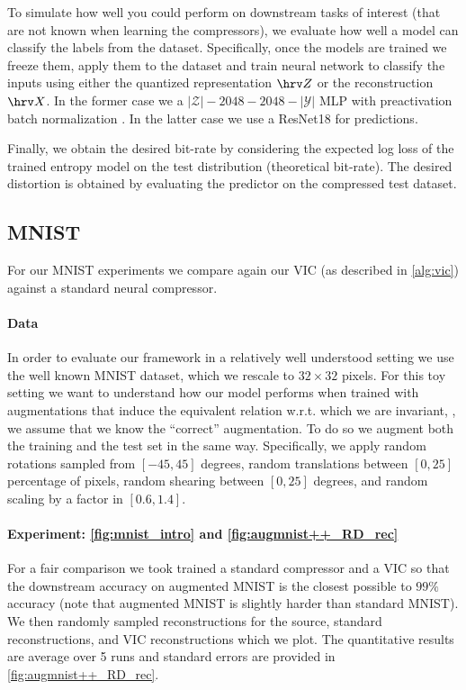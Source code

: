 \documentclass[final]{article}
\begin{document}
To simulate how well you could perform on downstream tasks of interest (that are not known when learning the compressors), we evaluate how well a model can classify the labels from the dataset.
Specifically, once the models are trained we freeze them, apply them to the dataset and train neural network to classify the inputs using either the quantized representation $\hrv Z$ or the reconstruction $\hrv X$.
In the former case we a $|\mathcal{Z}|-2048-2048-|\mathcal{Y}|$ MLP with preactivation batch normalization \cite{ioffe_batch_2015}.
In the latter case we use a ResNet18 for predictions.

Finally, we obtain the desired bit-rate by considering the expected log loss of the trained entropy model on the test distribution (\ie theoretical bit-rate).
The desired distortion is obtained by evaluating the predictor on the compressed test dataset.



\subsection{MNIST}
\label{appx:reproducability_mnist}

For our MNIST \cite{lecun_gradient-based_1998} experiments we compare again our VIC (as described in \cref{alg:vic}) against a standard neural compressor.

\paragraph{Data}
In order to evaluate our framework in a relatively well understood setting we use the well known  MNIST \cite{lecun_gradient-based_1998} dataset, which we rescale to $32\times32$ pixels.
For this toy setting we want to understand how our model performs when trained with augmentations that induce the equivalent relation w.r.t. which we are invariant, \ie, we assume that we know the ``correct'' augmentation.
To do so we augment both the training and the test set in the same way.
Specifically, we apply random rotations sampled from $[-45,45]$ degrees, random translations between $[0,25]$ percentage of pixels, random shearing between $[0,25]$ degrees, and random scaling by a factor in $[0.6,1.4]$. 

\paragraph{Experiment: \cref{fig:mnist_intro} and \cref{fig:augmnist++_RD_rec}}
For a fair comparison we took trained a standard compressor and a VIC so that the downstream accuracy on augmented MNIST is the closest possible to $99\%$ accuracy (note that augmented MNIST is slightly harder than standard MNIST).
We then randomly sampled reconstructions for the source, standard reconstructions, and VIC reconstructions which we plot.
The quantitative results are average over 5 runs and standard errors are provided in \cref{fig:augmnist++_RD_rec}.
\end{document}
